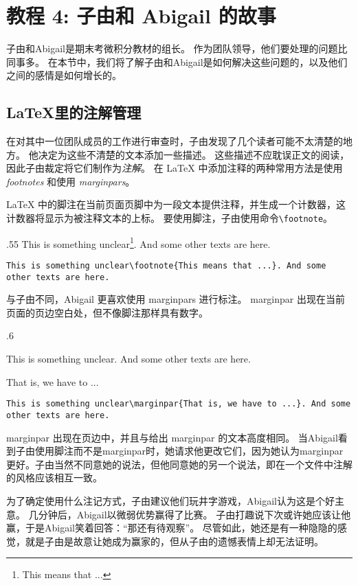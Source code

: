 \section{教程 4: 子由和 Abigail 的故事} %
子由和Abigail是期末考微积分教材的组长。 作为团队领导，他们要处理的问题比同事多。 在本节中，我们将了解子由和Abigail是如何解决这些问题的，以及他们之间的感情是如何增长的。

\subsection{\LaTeX 里的注解管理}
在对其中一位团队成员的工作进行审查时，子由发现了几个读者可能不太清楚的地方。 他决定为这些不清楚的文本添加一些描述。 这些描述不应耽误正文的阅读，因此子由裁定将它们制作为\emph{注解}。 在 \LaTeX{} 中添加注释的两种常用方法是使用 \emph{footnotes} 和使用 \emph{marginpars}。

\LaTeX{} 中的脚注在当前页面页脚中为一段文本提供注释，并生成一个计数器，这计数器将显示为被注释文本的上标。 要使用脚注，子由使用命令\verb=\footnote=。
\begin{miniexammar}{.55\textandmarginlen}{
This is something unclear\footnote{This means that ...}. And some other texts are here.
}
\begin{lstlisting}
This is something unclear\footnote{This means that ...}. And some other texts are here.
\end{lstlisting}
\end{miniexammar}

与子由不同，Abigail 更喜欢使用 marginpars 进行标注。 marginpar 出现在当前页面的页边空白处，但不像脚注那样具有数字。
\begin{miniexammar}{.6\textandmarginlen}{
\parbox{.68\textwidth}{This is something unclear. And some other texts are here.} \hspace{.03\textwidth}
\parbox{.27\textwidth}{That is, we have to ...}
}
\begin{lstlisting}
This is something unclear\marginpar{That is, we have to ...}. And some other texts are here.
\end{lstlisting}
\end{miniexammar}

marginpar 出现在页边中，并且与给出 marginpar 的文本高度相同。 当Abigail看到子由使用脚注而不是marginpar时，她请求他更改它们，因为她认为marginpar更好。子由当然不同意她的说法，但他同意她的另一个说法，即在一个文件中注解的风格应该相互一致。

为了确定使用什么注记方式，子由建议他们玩井字游戏，Abigail认为这是个好主意。 几分钟后，Abigail以微弱优势赢得了比赛。 子由打趣说下次或许她应该让他赢，于是Abigail笑着回答：“那还有待观察”。 尽管如此，她还是有一种隐隐的感觉，就是子由是故意让她成为赢家的，但从子由的遗憾表情上却无法证明。

